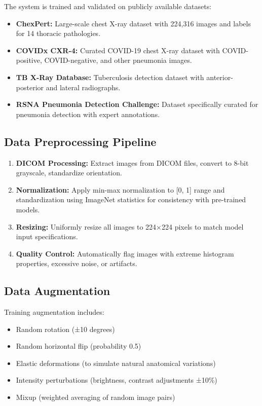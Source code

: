 {The system is trained and validated on publicly available datasets:

\begin{itemize}
    \item \textbf{ChexPert:} Large-scale chest X-ray dataset with 224,316 images and labels for 14 thoracic pathologies.
    \item \textbf{COVIDx CXR-4:} Curated COVID-19 chest X-ray dataset with COVID-positive, COVID-negative, and other pneumonia images.
    \item \textbf{TB X-Ray Database:} Tuberculosis detection dataset with anterior-posterior and lateral radiographs.
    \item \textbf{RSNA Pneumonia Detection Challenge:} Dataset specifically curated for pneumonia detection with expert annotations.
\end{itemize}

\subsection{Data Preprocessing Pipeline}

\begin{enumerate}
    \item \textbf{DICOM Processing:} Extract images from DICOM files, convert to 8-bit grayscale, standardize orientation.
    \item \textbf{Normalization:} Apply min-max normalization to [0, 1] range and standardization using ImageNet statistics for consistency with pre-trained models.
    \item \textbf{Resizing:} Uniformly resize all images to 224×224 pixels to match model input specifications.
    \item \textbf{Quality Control:} Automatically flag images with extreme histogram properties, excessive noise, or artifacts.
\end{enumerate}

\subsection{Data Augmentation}

Training augmentation includes:

\begin{itemize}
    \item Random rotation (±10 degrees)
    \item Random horizontal flip (probability 0.5)
    \item Elastic deformations (to simulate natural anatomical variations)
    \item Intensity perturbations (brightness, contrast adjustments ±10\%)
    \item Mixup (weighted averaging of random image pairs)
\end{itemize}

}
